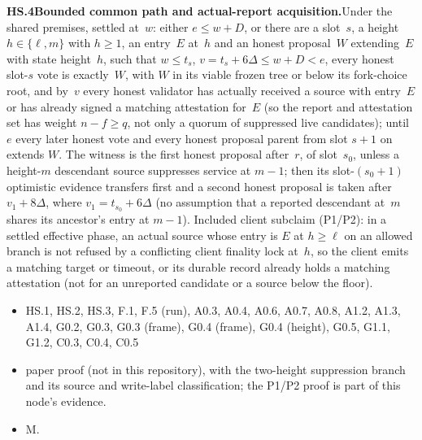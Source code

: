 \documentclass{article}
\newcommand{\dagnode}[6]{%
\par\medskip\noindent\textbf{#1\enspace #2.}\enspace #3
\begin{itemize}[leftmargin=2.2em,itemsep=0pt,topsep=2pt]
\item[\emph{Uses}] #4
\item[\emph{Evid.}] #5
\item[\emph{Task}] #6
\end{itemize}}
\begin{document}
\dagnode{HS.4}{Bounded common path and actual-report acquisition}{Under the
shared premises, settled at~$w$: either $e\leq w+D$, or there are a slot~$s$,
a height $h\in\{\ell,m\}$ with $h\geq1$, an entry~$E$ at~$h$ and an honest
proposal~$W$ extending~$E$ with state height~$h$, such that $w\leq t_s$,
$v=t_s+6\Delta\leq w+D<e$, every honest slot-$s$ vote is exactly~$W$, with $W$
in its viable frozen tree or below its fork-choice root, and by~$v$ every
honest validator has actually received a source with entry~$E$ or has already
signed a matching attestation for~$E$ (so the report and attestation set has weight
$n-f\geq q$, not only a quorum of suppressed live candidates); until~$e$ every
later honest vote and every honest proposal parent from slot $s+1$ on extends
$W$.  The witness is the first honest proposal after~$r$, of slot~$s_0$,
unless a height-$m$ descendant source suppresses service at $m-1$; then its
slot-$(s_0+1)$ optimistic evidence transfers first and a second honest
proposal is taken after $v_1+8\Delta$, where $v_1=t_{s_0}+6\Delta$ (no assumption that a reported
descendant at~$m$ shares its ancestor's entry at $m-1$).  Included client
subclaim (P1/P2): in a settled effective phase, an actual
source whose entry is $E$ at $h\geq\ell$ on an allowed branch is not refused
by a conflicting client finality lock at~$h$, so the client emits a matching
target or timeout, or its durable record already holds a matching attestation (not
for an unreported candidate or a source below the floor).}
{HS.1, HS.2, HS.3, F.1, F.5 (run), A0.3, A0.4, A0.6, A0.7, A0.8, A1.2, A1.3,
A1.4, G0.2, G0.3, G0.3 (frame), G0.4 (frame), G0.4 (height), G0.5, G1.1,
G1.2, C0.3, C0.4, C0.5}{paper proof (not in this repository), with the two-height suppression
branch and its source and write-label classification; the P1/P2 proof is
part of this node's evidence.}{M.}
\end{document}
